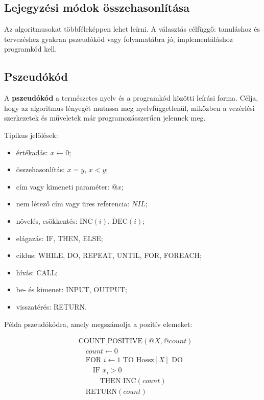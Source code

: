 \subsection{Lejegyzési módok összehasonlítása}

Az algoritmusokat többféleképpen lehet leírni. A választás célfüggő: tanuláshoz és tervezéshez gyakran pszeudókód vagy folyamatábra jó, implementáláshoz programkód kell.

\begin{center}

\end{center}

\subsection{Pszeudókód}

A \textbf{pszeudókód} a természetes nyelv és a programkód közötti leírási forma. Célja, hogy az algoritmus lényegét mutassa meg nyelvfüggetlenül, miközben a vezérlési szerkezetek és műveletek már programozásszerűen jelennek meg.

Tipikus jelölések:

\begin{itemize}
  \item értékadás: $x\leftarrow 0$;
  \item összehasonlítás: $x=y$, $x<y$;
  \item cím vagy kimeneti paraméter: $@x$;
  \item nem létező cím vagy üres referencia: $NIL$;
  \item növelés, csökkentés: $\text{INC}(i)$, $\text{DEC}(i)$;
  \item elágazás: IF, THEN, ELSE;
  \item ciklus: WHILE, DO, REPEAT, UNTIL, FOR, FOREACH;
  \item hívás: CALL;
  \item be- és kimenet: INPUT, OUTPUT;
  \item visszatérés: RETURN.
\end{itemize}

Példa pszeudókódra, amely megszámolja a pozitív elemeket:

\[
\begin{aligned}
&\text{COUNT\_POSITIVE}(@X,@count)\\
&\quad count\leftarrow 0\\
&\quad \text{FOR } i\leftarrow 1 \text{ TO Hossz}[X] \text{ DO}\\
&\quad\quad \text{IF } x_i>0\\
&\quad\quad\quad \text{THEN INC}(count)\\
&\quad \text{RETURN}(count)
\end{aligned}
\]

